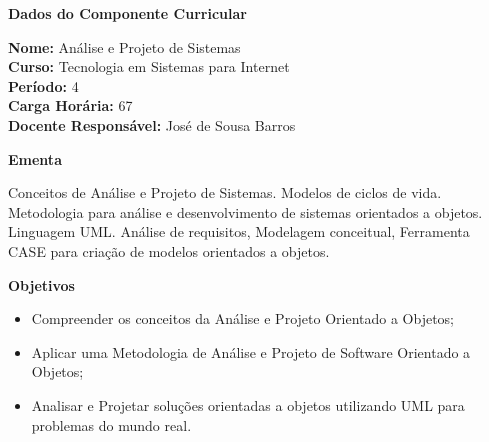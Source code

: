 

\begin{snugshade}\begin{center}\textbf{
	Dados do Componente Curricular
}\end{center}\end{snugshade}

\noindent 	\textbf{Nome:} Análise e Projeto de Sistemas
\\ 			\textbf{Curso:} Tecnologia em Sistemas para Internet
\\ 			\textbf{Período:} \unit{4}{\degree}
\\ 			\textbf{Carga Horária:} \unit{67}{\hour}
\\ 			\textbf{Docente Responsável:} José de Sousa Barros 


\begin{snugshade}\begin{center}\textbf{
    Ementa
\vphantom{q}}\end{center}\end{snugshade}

\noindent
Conceitos de Análise e Projeto de Sistemas. Modelos de ciclos de vida.  Metodologia para análise e desenvolvimento de sistemas orientados a objetos. Linguagem UML.  Análise de requisitos, Modelagem conceitual, Ferramenta CASE para criação de modelos orientados a objetos.


\begin{snugshade}\begin{center}\textbf{
    Objetivos
}\end{center}\end{snugshade}


\begin{itemize}

\item Compreender os conceitos da Análise e Projeto Orientado a Objetos;
\item Aplicar uma Metodologia de Análise e Projeto de Software Orientado a Objetos;
\item Analisar e Projetar soluções orientadas a objetos utilizando UML para problemas do mundo real.

\end{itemize} 



